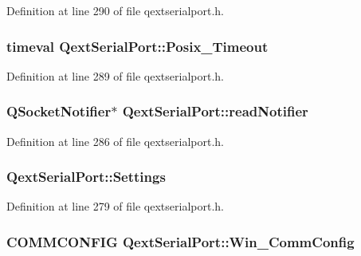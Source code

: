 Definition at line 290 of file qextserialport.\-h.

\hypertarget{class_qext_serial_port_ab91233846daffd88f3de767b4f677b94}{
\subsubsection[{Posix\-\_\-\-Timeout}]{ timeval Qext\-Serial\-Port\-::\-Posix\-\_\-\-Timeout\hspace{0.3cm}{\ttfamily [protected]}}}\label{class_qext_serial_port_ab91233846daffd88f3de767b4f677b94}


Definition at line 289 of file qextserialport.\-h.

\hypertarget{class_qext_serial_port_a3a9103c833808566a3227338abbe09ff}{
\subsubsection[{read\-Notifier}]{\setlength{\rightskip}{0pt plus 5cm}Q\-Socket\-Notifier$\ast$ Qext\-Serial\-Port\-::read\-Notifier\hspace{0.3cm}{\ttfamily [protected]}}}\label{class_qext_serial_port_a3a9103c833808566a3227338abbe09ff}


Definition at line 286 of file qextserialport.\-h.

\hypertarget{class_qext_serial_port_a0f211a568bf58945d6cfdbe81b2788d4}{
\subsubsection[{Settings}]{ Qext\-Serial\-Port\-::\-Settings\hspace{0.3cm}{\ttfamily [protected]}}}\label{class_qext_serial_port_a0f211a568bf58945d6cfdbe81b2788d4}


Definition at line 279 of file qextserialport.\-h.

\hypertarget{class_qext_serial_port_af1230bd3b947042b38303175d5f7c118}{
\subsubsection[{Win\-\_\-\-Comm\-Config}]{\setlength{\rightskip}{0pt plus 5cm}C\-O\-M\-M\-C\-O\-N\-F\-I\-G Qext\-Serial\-Port\-::\-Win\-\_\-\-Comm\-Config\hspace{0.3cm}{\ttfamily [protected]}}}\label{class_qext_serial_port_af1230bd3b947042b38303175d5f7c118}



